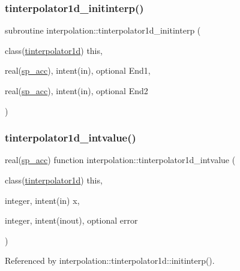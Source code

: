 \subsubsection{\texorpdfstring{tinterpolator1d\+\_\+initinterp()}{tinterpolator1d\_initinterp()}}
{\footnotesize\ttfamily subroutine interpolation\+::tinterpolator1d\+\_\+initinterp (\begin{DoxyParamCaption}\item[{class(\mbox{\hyperlink{structinterpolation_1_1tinterpolator1d}{tinterpolator1d}})}]{this,  }\item[{real(\mbox{\hyperlink{namespaceinterpolation_af72aa9a05feb8ef90b2d26e4a013abf3}{sp\+\_\+acc}}), intent(in), optional}]{End1,  }\item[{real(\mbox{\hyperlink{namespaceinterpolation_af72aa9a05feb8ef90b2d26e4a013abf3}{sp\+\_\+acc}}), intent(in), optional}]{End2 }\end{DoxyParamCaption})}

\mbox{\label{namespaceinterpolation_a8b3767144728c4ff1d5564b16b2b2e97}} 
\subsubsection{\texorpdfstring{tinterpolator1d\+\_\+intvalue()}{tinterpolator1d\_intvalue()}}
{\footnotesize\ttfamily real(\mbox{\hyperlink{namespaceinterpolation_af72aa9a05feb8ef90b2d26e4a013abf3}{sp\+\_\+acc}}) function interpolation\+::tinterpolator1d\+\_\+intvalue (\begin{DoxyParamCaption}\item[{class(\mbox{\hyperlink{structinterpolation_1_1tinterpolator1d}{tinterpolator1d}})}]{this,  }\item[{integer, intent(in)}]{x,  }\item[{integer, intent(inout), optional}]{error }\end{DoxyParamCaption})}



Referenced by interpolation\+::tinterpolator1d\+::initinterp().

